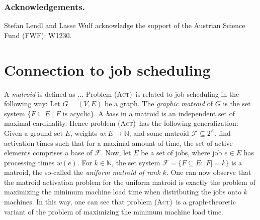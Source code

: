 \documentclass[runningheads]{llncs}
\numberwithin{equation}{section}
\newcommand{\N}{\mathbb{N}}
\newcommand{\set}[1]{\{ #1 \}}
\newcommand{\comment}[1]{\textcolor{red}{(L: #1)}}
\newcommand{\bigO}{\mathcal{O}}
\newcommand{\act}{\textsc{(Act)}}
\newcommand{\stact}{\textsc{(stAct)}}
\DeclareMathOperator{\tw}{tw}
\begin{document}
%

\subsubsection*{Acknowledgements.}

Stefan Lendl and Lasse Wulf acknowledge the support of the Austrian Science Fund (FWF):
W1230.

%
%





\appendix

\section{Connection to job scheduling}
\label{appendix:connection_act_job_scheduling}
A \emph{matroid} is defined as ...
Problem \act\ is related to job scheduling in the following way: Let $G = (V, E)$ be a graph. The \emph{graphic matroid} of $G$ is the set system $\set{F \subseteq E \mid F \text{ is acyclic}}$. A \emph{base} in a matroid is an independent set of maximal cardinality. Hence problem \act\ has the following generalization: Given a ground set $E$, weights $w: E \rightarrow \N$, and some matroid $\mathcal{F} \subseteq 2^E$, find activation times such that for a maximal amount of time, the set of active elements comprises a base of $\mathcal{F}$. Now, let $E$ be a set of jobs, where job $e \in E$ has processing times $w(e)$. For $k \in \N$, the set system $\mathcal{F} = \set{F \subseteq E : |F| = k}$ is a matroid, the so-called the \emph{uniform matroid of rank $k$}. One can now observe that the matroid activation problem for the uniform matroid is exactly the problem of maximizing the minimum machine load time when distributing the jobs onto $k$ machines. In this way, one can see that problem \act\ is a graph-theoretic variant of the problem of maximizing the minimum machine load time.
\end{document}
